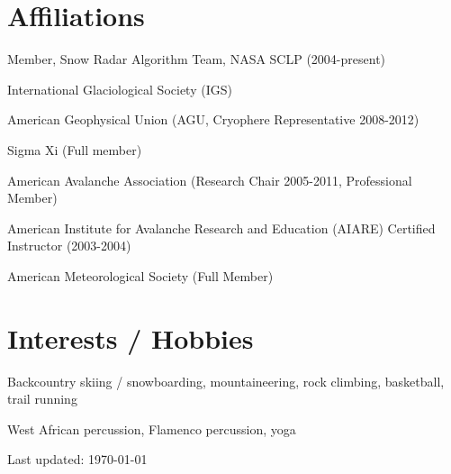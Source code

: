 \documentclass[11pt]{article}
\renewenvironment{itemize}{
  \begin{list}{}{
    \setlength{\leftmargin}{1.5em}
    \setlength{\itemsep}{0pt}
    \setlength{\parskip}{0pt}
  }
}{
  \end{list}
}
\begin{document}
\section*{Affiliations}
\begin{itemize}
\item Member, Snow Radar Algorithm Team, NASA SCLP (2004-present)
\item International Glaciological Society (IGS)
\item American Geophysical Union (AGU, Cryophere Representative 2008-2012)
\item Sigma Xi (Full member)
\item American Avalanche Association (Research Chair 2005-2011, Professional Member)
\item American Institute for Avalanche Research and Education (AIARE) Certified Instructor (2003-2004)
\item American Meteorological Society (Full Member)
\end{itemize}


\section*{Interests / Hobbies}
\begin{itemize}
\item Backcountry skiing / snowboarding, mountaineering, rock climbing, basketball, trail running
\item West African percussion, Flamenco percussion, yoga
\end{itemize}


\setlength{\extrarowheight}{5pt}


\bigskip
\begin{center}
  \begin{footnotesize}
    Last updated: \today
  \end{footnotesize}
\end{center}

\end{document}
